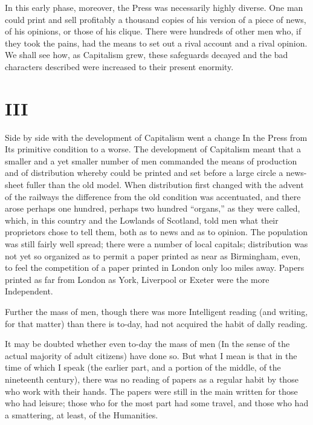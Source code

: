 \documentclass{book}
\begin{document}
In this early phase, moreover, the Press was necessarily highly diverse. One man could print and sell profitably a thousand copies of his version of a piece of news, of his opinions, or those of his clique. There were hundreds of other men who, if they took the pains, had the means to set out a rival account and a rival opinion. We shall see how, as Capitalism grew, these safeguards decayed and the bad characters described were increased to their present enormity.

\chapter*{III}
\label{chapter-4}
Side by side with the development of Capitalism went a change In the Press from Its primitive condition to a worse. The development of Capitalism meant that a smaller and a yet smaller number of men commanded the means of production and of distribution whereby could be printed and set before a large circle a news-sheet fuller than the old model. When distribution first changed with the advent of the railways the difference from the old condition was accentuated, and there arose perhaps one hundred, perhaps two hundred “organs,” as they were called, which, in this country and the Lowlands of Scotland, told men what their proprietors chose to tell them, both as to news and as to opinion. The population was still fairly well spread; there were a number of local capitals; distribution was not yet so organized as to permit a paper printed as near as Birmingham, even, to feel the competition of a paper printed in London only loo miles away. Papers printed as far from London as York, Liverpool or Exeter were the more Independent.

Further the mass of men, though there was more Intelligent reading (and writing, for that matter) than there is to-day, had not acquired the habit of dally reading.

It may be doubted whether even to-day the mass of men (In the sense of the actual majority of adult citizens) have done so. But what I mean is that in the time of which I speak (the earlier part, and a portion of the middle, of the nineteenth century), there was no reading of papers as a regular habit by those who work with their hands. The papers were still in the main written for those who had leisure; those who for the most part had some travel, and those who had a smattering, at least, of the Humanities.
\end{document}
